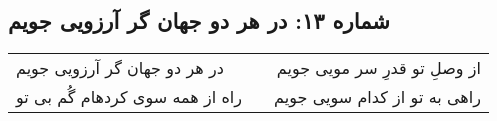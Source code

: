 \begin{center}
\section*{شماره ۱۳: در هر دو جهان گر آرزویی جویم}
\label{sec:013}
\begin{longtable}{l p{0.5cm} r}
در هر دو جهان گر آرزویی جویم
&&
از وصلِ تو قدرِ سر مویی جویم
\\
راه از همه سوی کردهام گُم بی تو
&&
راهی به تو از کدام سویی جویم
\\
\end{longtable}
\end{center}
